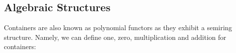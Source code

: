 \subsection{Algebraic Structures}

Containers are also known as polynomial functors as they exhibit a semiring structure. Namely, we can define one, zero, multiplication and addition for containers:

\begin{code}%
\>[0]\AgdaSpace{}%
\AgdaSymbol{:}\AgdaSpace{}%
\<%
\\
\>[0]\AgdaSpace{}%
\AgdaSymbol{=}\AgdaSpace{}%
\AgdaSpace{}%
\AgdaSpace{}%
\AgdaSpace{}%
\<%
\\
%
\\[\AgdaEmptyExtraSkip]%
\>[0]\AgdaSpace{}%
\AgdaSymbol{:}\AgdaSpace{}%
\<%
\\
\>[0]\AgdaSpace{}%
\AgdaSymbol{=}\AgdaSpace{}%
\AgdaSpace{}%
\AgdaSpace{}%
\<%
\\
%
\\[\AgdaEmptyExtraSkip]%
\>[0]\AgdaSpace{}%
\AgdaSymbol{:}\AgdaSpace{}%
\AgdaSpace{}%
\AgdaSpace{}%
\AgdaSpace{}%
\AgdaSpace{}%
\<%
\\
\>[0]\AgdaSymbol{(}\AgdaSpace{}%
\AgdaSpace{}%
\AgdaSymbol{)}\AgdaSpace{}%
\AgdaSpace{}%
\AgdaSymbol{(}\AgdaSpace{}%
\AgdaSpace{}%
\AgdaSymbol{)}\AgdaSpace{}%
\AgdaSymbol{=}\AgdaSpace{}%
\AgdaSymbol{(}\AgdaSpace{}%
\AgdaSpace{}%
\AgdaSymbol{)}\AgdaSpace{}%
\AgdaSpace{}%
\AgdaSpace{}%
\AgdaSymbol{(}\AgdaSpace{}%
\AgdaOperator{\AgdaInductiveConstructor{,}}\AgdaSpace{}%
\AgdaSymbol{)}\AgdaSpace{}%
\AgdaSpace{}%
\AgdaSpace{}%
\AgdaSpace{}%
\AgdaSpace{}%
\AgdaSpace{}%
\<%
\\
%
\\[\AgdaEmptyExtraSkip]%

\end{code}
